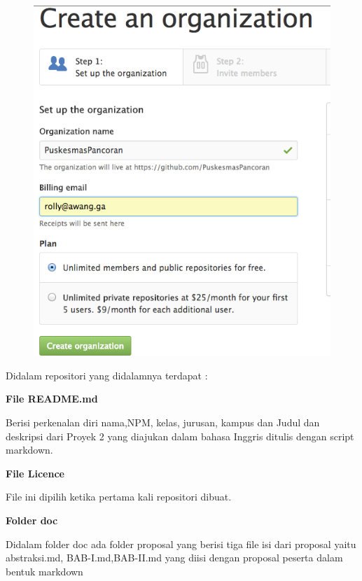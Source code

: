 \begin{figure}[H]
    \centering
    \includegraphics[scale=0.7]{figures/11.png}
    \label{11}
\end{figure}

Didalam	repositori	yang	didalamnya	terdapat	: \par 
\textbf{File	README.md} \par 
Berisi	 perkenalan	 diri	 nama,NPM,	 kelas,	 jurusan,	 kampus	 dan	 Judul	 dan	 deskripsi	 dari	Proyek	2	yang	diajukan	dalam	bahasa	Inggris	ditulis	dengan	script	markdown. \par 

\textbf{File	Licence} \par 
File	ini	dipilih	ketika	pertama	kali	repositori	dibuat. \par 

\textbf{Folder	doc} \par
Didalam	 folder	 doc	 ada	 folder	 proposal	 yang	 berisi	 tiga	 file	 isi	 dari	 proposal	 yaitu	abstraksi.md,	 BAB-I.md,BAB-II.md	 yang	 diisi	 dengan	 proposal	 peserta	 dalam	 bentuk	
markdown \par 

